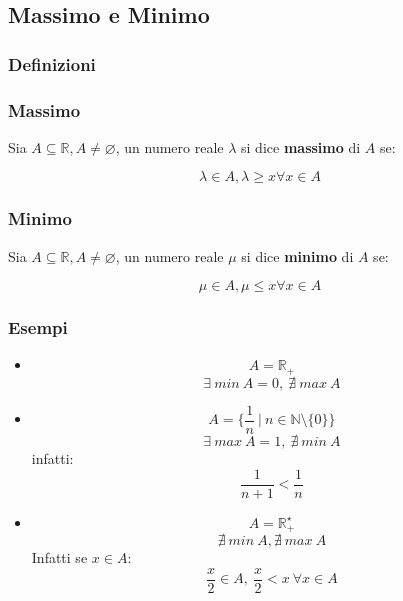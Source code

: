 \subsection{Massimo e Minimo}
\subsubsection*{Definizioni}
\subsubsection{Massimo}
Sia $A \subseteq \mathbb{R}, A \neq \varnothing$, un numero reale $\lambda$ si dice \textbf{massimo} di $A$ se:
\begin{Large}
    \begin{equation*}
        \lambda \in A, \lambda \geq x \forall x \in A
    \end{equation*}
\end{Large}
\subsubsection{Minimo}
Sia $A \subseteq \mathbb{R}, A \neq \varnothing$, un numero reale $\mu$ si dice \textbf{minimo} di $A$ se:
\begin{Large}
    \begin{equation*}
        \mu \in A, \mu \leq x \forall x \in A
    \end{equation*}
\end{Large}
\subsubsection*{Esempi}

    \begin{itemize}
    \item
    \[
        A = \mathbb{R}_{+}    
    \]
    \[
        \exists\ min\ A = 0,\ \nexists\ max\ A    
    \]

    \item
    \[
        A = \{\frac{1}{n}\ |\ n\in \mathbb{N}\setminus\{0\}\}
    \]
    \[
        \exists\ max\ A = 1,\ \nexists\ min\ A    
    \]
    \newline
    infatti: \[
        \frac{1}{n+1} < \frac{1}{n}
    \]
    \newline
    \item
    \[
        A = \mathbb{R}_{+}^{\star}    
    \]
    \[
        \nexists\ min\ A, \nexists\ max\ A    
    \]
    \newline
    Infatti se $x \in A$:
    \[
        \frac{x}{2} \in A,\ \frac{x}{2} < x\ \forall x \in A    
    \]
    \end{itemize}

